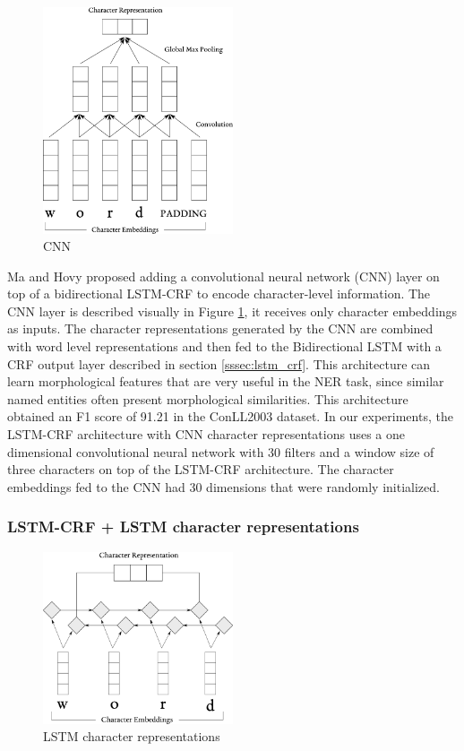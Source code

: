 \documentclass[sigconf]{acmart}
\begin{document}
\begin{figure}
  \centering
  \includegraphics[width=0.5\textwidth]{pics/cnn}
  \caption{CNN}
  \label{fig:cnn}
\end{figure}

Ma and Hovy \cite{Ma2016} proposed adding a convolutional neural network (CNN) layer 
on top of a bidirectional LSTM-CRF to encode character-level information. The CNN
layer is described visually in Figure \ref{fig:cnn}, it receives
only character embeddings as inputs. The character representations generated by the CNN 
are combined with word level representations and then fed to the Bidirectional LSTM with
a CRF output layer described in section \ref{sssec:lstm_crf}.
This architecture can learn morphological features that are very
useful in the NER task, since similar named entities often present morphological similarities. 
This architecture obtained an F1 score of 91.21 in the ConLL2003 dataset. In our experiments, 
the LSTM-CRF architecture with CNN character representations uses a one dimensional convolutional 
neural network with 30 filters and a window size of three characters on top of the LSTM-CRF architecture.
The character embeddings fed to the CNN had 30 dimensions that were randomly initialized.

\subsubsection{LSTM-CRF + LSTM character representations}

\begin{figure}
  \centering
  \includegraphics[width=0.5\textwidth]{pics/lstm_char_representations}
  \caption{LSTM character representations}
  \label{fig:lstm_char}
\end{figure}
\end{document}
